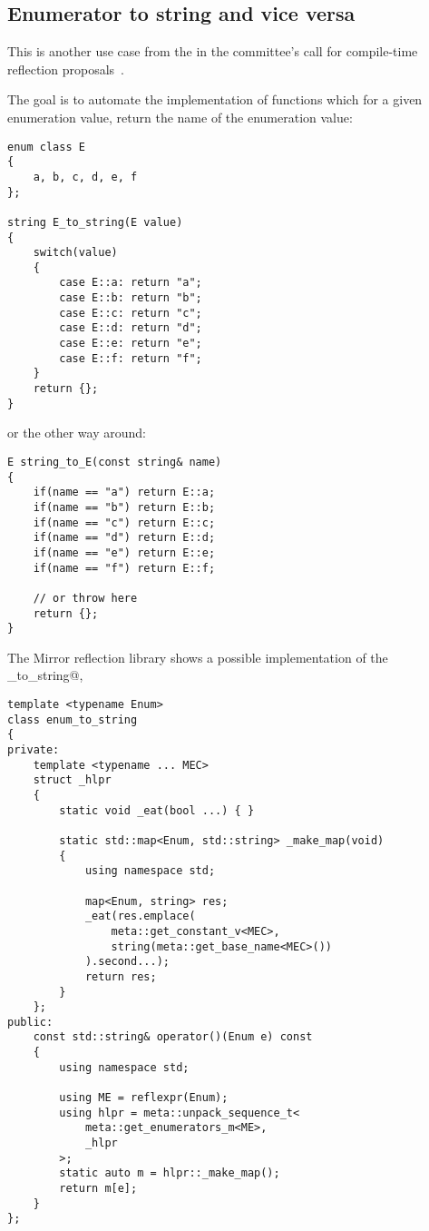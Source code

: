 \subsection{Enumerator to string and vice versa}
\label{use-case-enum-to-string}

This is another use case from the  in the committee's
call for compile-time reflection proposals~\cite{ISOCPP-N3814}. 

The goal is to automate the implementation of functions which for a given
enumeration value, return the name of the enumeration value:

\begin{verbatim}
enum class E
{
	a, b, c, d, e, f
};

string E_to_string(E value)
{
	switch(value)
	{
		case E::a: return "a";
		case E::b: return "b";
		case E::c: return "c";
		case E::d: return "d";
		case E::e: return "e";
		case E::f: return "f";
	}
	return {};
}
\end{verbatim}

or the other way around:

\begin{verbatim}
E string_to_E(const string& name)
{
	if(name == "a") return E::a;
	if(name == "b") return E::b;
	if(name == "c") return E::c;
	if(name == "d") return E::d;
	if(name == "e") return E::e;
	if(name == "f") return E::f;

	// or throw here
	return {};
}
\end{verbatim}

The Mirror reflection library shows a possible implementation of the
\verb@enum_to_string@,

\begin{verbatim}
template <typename Enum>
class enum_to_string
{
private:
	template <typename ... MEC>
	struct _hlpr
	{
		static void _eat(bool ...) { }

		static std::map<Enum, std::string> _make_map(void)
		{
			using namespace std;

			map<Enum, string> res;
			_eat(res.emplace(
				meta::get_constant_v<MEC>,
				string(meta::get_base_name<MEC>())
			).second...);
			return res;
		}
	};
public:
	const std::string& operator()(Enum e) const
	{
		using namespace std;

		using ME = reflexpr(Enum);
		using hlpr = meta::unpack_sequence_t<
			meta::get_enumerators_m<ME>,
			_hlpr
		>;
		static auto m = hlpr::_make_map();
		return m[e];
	}
};
\end{verbatim}

